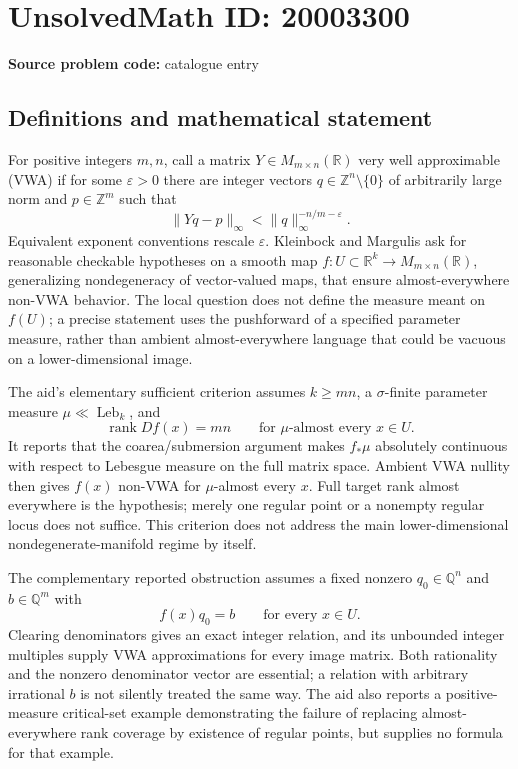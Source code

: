 \documentclass[11pt]{article}
\newcommand{\Z}{\mathbb{Z}}
\newcommand{\Q}{\mathbb{Q}}
\newcommand{\R}{\mathbb{R}}
\begin{document}
\section*{UnsolvedMath ID: 20003300}
\textbf{Source problem code:} catalogue entry
\subsection{Definitions and mathematical statement}
For positive integers $m,n$, call a matrix $Y\in M_{m\times n}(\R)$ very well approximable (VWA) if for some $\varepsilon>0$ there are integer vectors $q\in\Z^n\setminus\{0\}$ of arbitrarily large norm and $p\in\Z^m$ such that
\[
 \|Yq-p\|_\infty<\|q\|_\infty^{-n/m-\varepsilon}.
\]
Equivalent exponent conventions rescale $\varepsilon$. Kleinbock and Margulis ask for reasonable checkable hypotheses on a smooth map $f:U\subset\R^k\to M_{m\times n}(\R)$, generalizing nondegeneracy of vector-valued maps, that ensure almost-everywhere non-VWA behavior. The local question does not define the measure meant on $f(U)$; a precise statement uses the pushforward of a specified parameter measure, rather than ambient almost-everywhere language that could be vacuous on a lower-dimensional image.

The aid's elementary sufficient criterion assumes $k\geq mn$, a $\sigma$-finite parameter measure $\mu\ll\operatorname{Leb}_k$, and
\[
 \operatorname{rank}Df(x)=mn\qquad\text{for }\mu\text{-almost every }x\in U.
\]
It reports that the coarea/submersion argument makes $f_*\mu$ absolutely continuous with respect to Lebesgue measure on the full matrix space. Ambient VWA nullity then gives $f(x)$ non-VWA for $\mu$-almost every $x$. Full target rank almost everywhere is the hypothesis; merely one regular point or a nonempty regular locus does not suffice. This criterion does not address the main lower-dimensional nondegenerate-manifold regime by itself.

The complementary reported obstruction assumes a fixed nonzero $q_0\in\Q^n$ and $b\in\Q^m$ with
\[
 f(x)q_0=b\qquad\text{for every }x\in U.
\]
Clearing denominators gives an exact integer relation, and its unbounded integer multiples supply VWA approximations for every image matrix. Both rationality and the nonzero denominator vector are essential; a relation with arbitrary irrational $b$ is not silently treated the same way. The aid also reports a positive-measure critical-set example demonstrating the failure of replacing almost-everywhere rank coverage by existence of regular points, but supplies no formula for that example.
\end{document}
